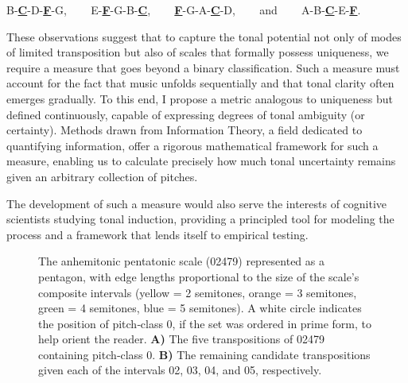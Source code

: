 \documentclass[10pt,twocolumn]{article}
\numberwithin{equation}{section} %
\begin{document}
B\text{$\flat$}-\textbf{\underline{C}}-D-\textbf{\underline{F}}-G,     E\text{$\flat$}-\textbf{\underline{F}}-G-B\text{$\flat$}-\textbf{\underline{C}},     \textbf{\underline{F}}-G-A-\textbf{\underline{C}}-D,     and     A\text{$\flat$}-B\text{$\flat$}-\textbf{\underline{C}}-E\text{$\flat$}-\textbf{\underline{F}}.

These
observations suggest that to capture the tonal potential not only of modes of
limited transposition but also of scales that formally possess uniqueness, we
require a measure that goes beyond a binary classification. Such a measure must
account for the fact that music unfolds sequentially and that tonal clarity
often emerges gradually. To this end, I propose a metric analogous to
uniqueness but defined continuously, capable of expressing degrees of tonal
ambiguity (or certainty). Methods drawn from Information Theory, a field
dedicated to quantifying information, offer a rigorous mathematical framework
for such a measure, enabling us to calculate precisely how much tonal
uncertainty remains given an arbitrary collection of pitches.

The development
of such a measure would also serve the interests of cognitive scientists
studying tonal induction, providing a principled tool for modeling the process
and a framework that lends itself to empirical testing.

\begin{figure}[htbp]
\centering
{}
\caption{The anhemitonic pentatonic scale
(02479) represented as a pentagon, with edge lengths proportional to the size
of the scale’s composite intervals (yellow = 2 semitones, orange = 3 semitones,
green = 4 semitones, blue = 5 semitones). A white circle indicates the position
of pitch‑class 0, if the set was ordered in prime form, to help orient the
reader. \textbf{A)} The five transpositions of 02479 containing pitch‑class 0. \textbf{B)} The remaining candidate transpositions given each of the intervals
02, 03, 04, and 05, respectively.}
\label{fig:necklaces}
\end{figure}
\end{document}
